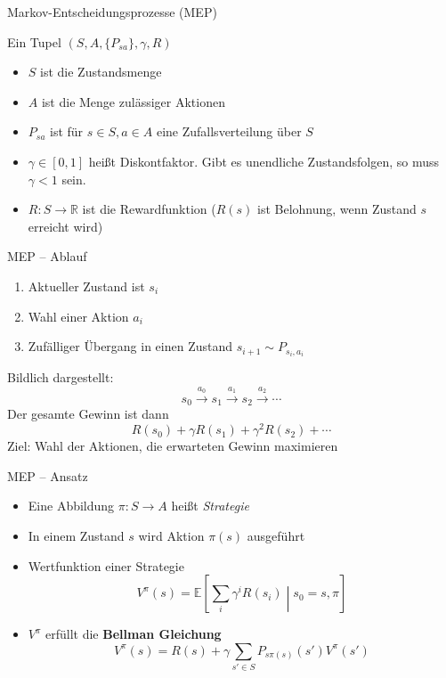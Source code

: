\documentclass[xcolor={dvipsnames,svgnames}]{beamer}
\begin{document}
\begin{frame}{Markov-Entscheidungsprozesse (MEP)}

  \begin{definition}
    Ein Tupel $(S, A, \{P_{sa}\},\gamma,R)$
    \begin{itemize}
    \item $S$ ist die Zustandsmenge
    \item $A$ ist die Menge zulässiger Aktionen
    \item $P_{sa}$ ist für $s \in S, a \in A$ eine Zufallsverteilung über $S$
    \item $\gamma \in \left[ 0, 1 \right]$ heißt Diskontfaktor. Gibt es
      unendliche Zustandsfolgen, so muss $\gamma < 1$ sein.
    \item $R : S \to \mathbb{R}$ ist die Rewardfunktion ($R(s)$ ist
      Belohnung, wenn Zustand $s$ erreicht wird)
    \end{itemize}
  \end{definition}
\end{frame}

\begin{frame}{MEP -- Ablauf}
  \begin{enumerate}
  \item Aktueller Zustand ist $s_i$
  \item Wahl einer Aktion $a_i$
  \item Zufälliger Übergang in einen Zustand $s_{i+1} \sim P_{s_i,a_i}$
  \end{enumerate}
  Bildlich dargestellt:
  \[
    s_0 \xrightarrow{a_0} s_1 \xrightarrow{a_1} s_2 \xrightarrow{a_2} \cdots
  \]
  Der gesamte Gewinn ist dann
  \[
    R(s_0) + \gamma R(s_1) + \gamma^2 R(s_2) + \cdots
  \]
  Ziel: Wahl der Aktionen, die erwarteten Gewinn maximieren
\end{frame}

\begin{frame}{MEP -- Ansatz}
  \begin{itemize}
  \item Eine Abbildung $\pi : S \to A$ heißt \textit{Strategie}
  \item In einem Zustand $s$ wird Aktion $\pi(s)$ ausgeführt
  \item Wertfunktion einer Strategie \[V^\pi(s) =
    \mathbb{E}\left[\sum_i \gamma^i R(s_i) \middle| s_0 = s, \pi \right]\]
  \item $V^\pi$ erfüllt die \textbf{Bellman Gleichung}
    \[
      V^\pi(s) = R(s) + \gamma \sum_{s'\in S} P_{s\pi(s)}(s') V^\pi(s')
    \]
  \end{itemize}
\end{frame}
\end{document}
